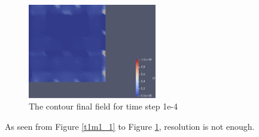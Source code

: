 \documentclass{article}
\begin{document}
\begin{figure}[hbt!]
    \centering
    \includegraphics[width=0.5\textwidth]{Figures/e-4 20x20/contour.png}
    \caption{The contour final field for time step 1e-4}
    \label{t1m1_2} 
\end{figure}

As seen from Figure \ref{t1m1_1} to Figure \ref{t1m1_2}, resolution is not enough. 


\clearpage
\end{document}
